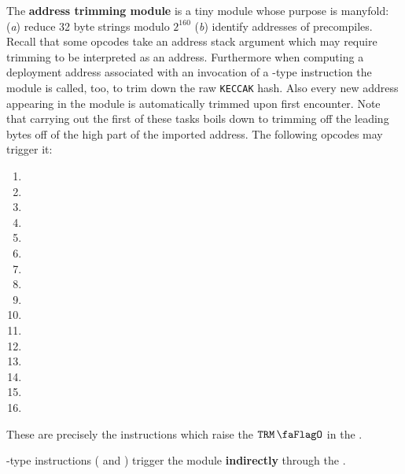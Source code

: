 The \textbf{address trimming module} is a tiny module whose purpose is manyfold:
(\emph{a})
reduce 32 byte strings modulo $2^{160}$
(\emph{b})
identify addresses of precompiles.
Recall that some opcodes take an address stack argument which may require trimming to be interpreted as an address.
Furthermore when computing a deployment address associated with an invocation of a -type instruction the \rlpAddrMod{} module is called, too, to trim down the raw \texttt{KECCAK} hash.
Also every new address appearing in the \hubMod{} module is automatically trimmed upon first encounter.
Note that carrying out the first of these tasks boils down to trimming off the leading bytes off of the high part of the imported address. The following opcodes may trigger it:
\begin{multicols}{4}
	\begin{enumerate}
		\item {}
		\item[\vspace{\fill}]
		\item[\vspace{\fill}]
		\item[\vspace{\fill}]
		\item {}
		\item {}
		\item {}
		\item[\vspace{\fill}]
		\item {}
		\item {}
		\item {}
		\item {}
		\item {}
		\item[\vspace{\fill}]
		\item[\vspace{\fill}]
		\item[\vspace{\fill}]
	\end{enumerate}
\end{multicols}
These are precisely the instructions which raise the $\trmFlag$ in the \hubMod{}.

\saNote{} -type instructions ( and ) trigger the \trmMod{} module \textbf{indirectly} through the \rlpAddrMod{}.
